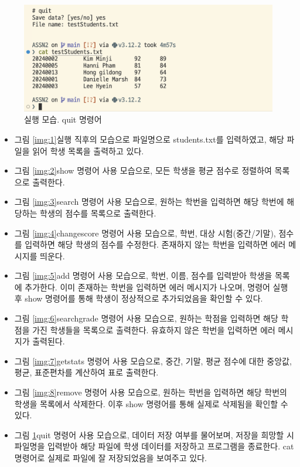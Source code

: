 \documentclass{article}
\begin{document}
\begin{figure}
  \includegraphics[width=\textwidth]{screenshots/9.png}
  \caption{실행 모습. quit 명령어}
  \label{img:9}
\end{figure}

\begin{itemize}
  \item 그림 \ref{img:1}\은 실행 직후의 모습으로
파일명으로 students.txt를 입력하였고, 해당 파일을 읽어 학생 목록을
출력하고 있다.
\item 
그림 \ref{img:2}\은 show 명령어 사용 모습으로, 모든 학생을 평균 점수로 정렬하여 목록으로 출력한다.
\item 
그림 \ref{img:3}\은 search 명령어 사용 모습으로, 원하는 학번을 입력하면 해당 학번에 해당하는 학생의 점수를 목록으로 출력한다.
\item 
그림 \ref{img:4}\은 changescore 명령어 사용 모습으로, 학번, 대상 시험(중간/기말), 점수를 입력하면 해당 학생의 점수를 수정한다. 존재하지 않는 학번을 입력하면 에러 메시지를 띄운다.
\item 
그림 \ref{img:5}\은 add 명령어 사용 모습으로, 학번, 이름, 점수를 입력받아 학생을 목록에 추가한다. 이미 존재하는 학번을 입력하면 에러 메시지가 나오며, 명령어 실행 후 show 명령어를 통해 학생이 정상적으로 추가되었음을 확인할 수 있다.
\item 
그림 \ref{img:6}\은 searchgrade 명령어 사용 모습으로, 원하는 학점을 입력하면 해당 학점을 가진 학생들을 목록으로 출력한다. 유효하지 않은 학번을 입력하면 에러 메시지가 출력된다.
\item 
그림 \ref{img:7}\은 getstats 명령어 사용 모습으로, 중간, 기말, 평균 점수에 대한 중앙값, 평균, 표준편차를 계산하여 표로 출력한다.
\item 
그림 \ref{img:8}\은 remove 명령어 사용 모습으로, 원하는 학번을 입력하면 해당 학번의 학생을 목록에서 삭제한다. 이후 show 명령어를 통해 실제로 삭제됨을 확인할 수 있다.
\item
그림 \ref{img:9}\은 quit 명령어 사용 모습으로, 데이터 저장 여부를 물어보며, 저장을 희망할 시 파일명을 입력받아 해당 파일에 학생 데이터를 저장하고 프로그램을 종료한다. cat 명령어로 실제로 파일에 잘 저장되었음을 보여주고 있다.
\end{itemize}
\end{document}

